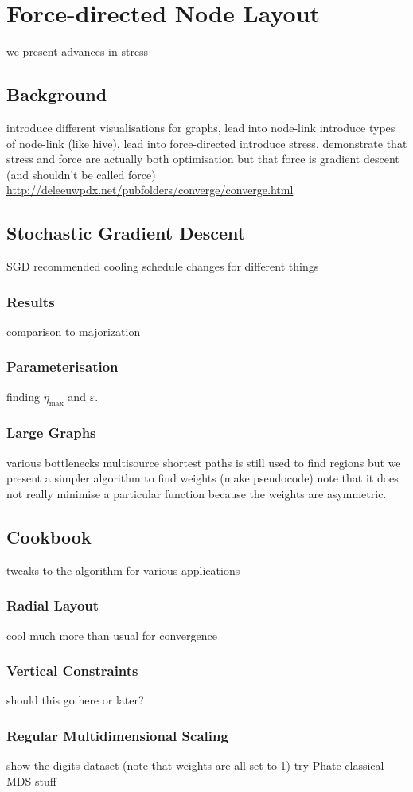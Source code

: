 \chapter{Force-directed Node Layout}
we present advances in stress

\section{Background}
introduce different visualisations for graphs, lead into node-link
introduce types of node-link (like hive), lead into force-directed
introduce stress, demonstrate that stress and force are actually both optimisation but that force is gradient descent (and shouldn't be called force)
\url{http://deleeuwpdx.net/pubfolders/converge/converge.html}

\section{Stochastic Gradient Descent}
SGD
recommended cooling schedule changes for different things
\subsection{Results}
comparison to majorization
\subsection{Parameterisation}
finding $\eta_{\max}$ and $\varepsilon$.
\subsection{Large Graphs}
various bottlenecks
multisource shortest paths is still used to find regions
but we present a simpler algorithm to find weights (make pseudocode)
note that it does not really minimise a particular function because the weights are asymmetric.

\section{Cookbook}
tweaks to the algorithm for various applications
\subsection{Radial Layout}
cool much more than usual for convergence
\subsection{Vertical Constraints}
should this go here or later?
\subsection{Regular Multidimensional Scaling}
show the digits dataset (note that weights are all set to 1)
try Phate classical MDS stuff
